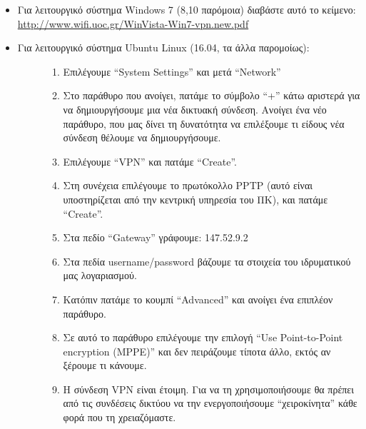 \documentclass[a4paper,11pt,greek]{article}
\begin{document}
\begin{itemize}
\item {} 
Για λειτουργικό σύστημα Windows 7 (8,10 παρόμοια) διαβάστε αυτό το κείμενο: \url{http://www.wifi.uoc.gr/WinVista-Win7-vpn.new.pdf}

\item {} \begin{description}
\item[{Για λειτουργικό σύστημα Ubuntu Linux (16.04, τα άλλα παρομοίως):}] \leavevmode\begin{enumerate}
\item {} 
Επιλέγουμε ``System Settings'' και μετά ``Network''

\item {} 
Στο παράθυρο που ανοίγει, πατάμε το σύμβολο ``+'' κάτω αριστερά για να δημιουργήσουμε μια νέα δικτυακή σύνδεση. Ανοίγει ένα νέο παράθυρο, που μας δίνει τη δυνατότητα να επιλέξουμε τι είδους νέα σύνδεση θέλουμε να δημιουργήσουμε.

\item {} 
Επιλέγουμε ``VPN'' και πατάμε ``Create''.

\item {} 
Στη συνέχεια επιλέγουμε το πρωτόκολλο PPTP (αυτό είναι υποστηρίζεται από την κεντρική υπηρεσία του ΠΚ), και πατάμε ``Create''.

\item {} 
Στα πεδίο ``Gateway'' γράφουμε: 147.52.9.2

\item {} 
Στα πεδία username/password βάζουμε τα στοιχεία του ιδρυματικού μας λογαριασμού.

\item {} 
Κατόπιν πατάμε το κουμπί ``Advanced'' και ανοίγει ένα επιπλέον παράθυρο.

\item {} 
Σε αυτό το παράθυρο επιλέγουμε την επιλογή ``Use Point-to-Point encryption (MPPE)'' και δεν πειράζουμε τίποτα άλλο, εκτός αν ξέρουμε τι κάνουμε.

\item {} 
Η σύνδεση VPN είναι έτοιμη. Για να τη χρησιμοποιήσουμε θα πρέπει από τις συνδέσεις δικτύου να την ενεργοποιήσουμε ``χειροκίνητα'' κάθε φορά που τη χρειαζόμαστε.

\end{enumerate}

\end{description}

\end{itemize}
\end{document}
